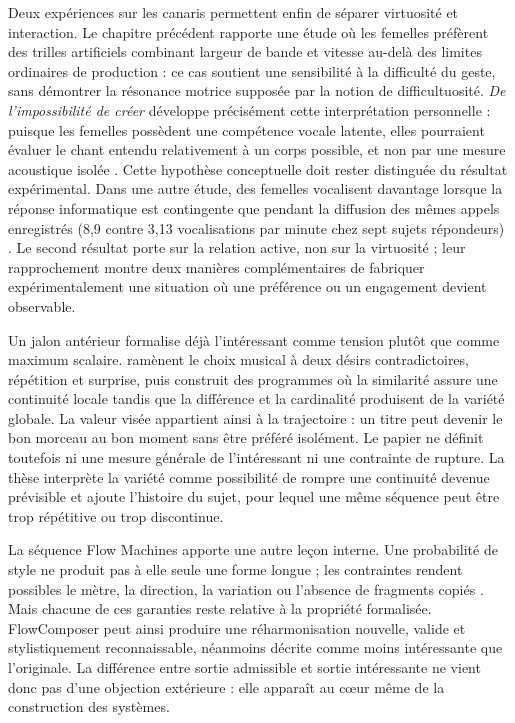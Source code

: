 \documentclass[11pt,a4paper]{article}
\begin{document}
Deux expériences sur les canaris permettent enfin de séparer virtuosité et
interaction. Le chapitre précédent rapporte une étude où les femelles préfèrent
des trilles artificiels combinant largeur de bande et vitesse au-delà des limites
ordinaires de production : ce cas soutient une sensibilité à la difficulté du
geste, sans démontrer la résonance motrice supposée par la notion de
difficultuosité. \emph{De l'impossibilité de créer} développe précisément cette
interprétation personnelle : puisque les femelles possèdent une compétence vocale
latente, elles pourraient évaluer le chant entendu relativement à un corps possible,
et non par une mesure acoustique isolée \parencite{pachet2026impossibilite}. Cette
hypothèse conceptuelle doit rester distinguée du résultat expérimental. Dans une
autre étude, des femelles vocalisent davantage lorsque
la réponse informatique est contingente que pendant la diffusion des mêmes
appels enregistrés (8,9 contre 3,13 vocalisations par minute chez sept sujets
répondeurs) \parencite{pachet2011hitsong,lerch2011closedloop}. Le second résultat
porte sur la relation active, non sur la virtuosité ; leur rapprochement montre
deux manières complémentaires de fabriquer expérimentalement une situation où
une préférence ou un engagement devient observable.

Un jalon antérieur formalise déjà l'intéressant comme tension plutôt que comme
maximum scalaire. \textcite{pachet1999programs} ramènent le choix musical à deux
désirs contradictoires, répétition et surprise, puis construit des programmes où
la similarité assure une continuité locale tandis que la différence et la
cardinalité produisent de la variété globale. La valeur visée appartient ainsi à
la trajectoire : un titre peut devenir le bon morceau au bon moment sans être
préféré isolément. Le papier ne définit toutefois ni une mesure générale de
l'intéressant ni une contrainte de rupture. La thèse interprète la variété comme
possibilité de rompre une continuité devenue prévisible et ajoute l'histoire du
sujet, pour lequel une même séquence peut être trop répétitive ou trop
discontinue.

La séquence Flow Machines apporte une autre leçon interne. Une probabilité de style
ne produit pas à elle seule une forme longue ; les contraintes rendent possibles le
mètre, la direction, la variation ou l'absence de fragments copiés
\parencite{pachet2011markov,barbieri2012lyrics,papadopoulos2014avoiding,
papadopoulos2016nonplagiaristic,papadopoulos2016flowcomposer,
pachet2017variations}. Mais chacune de ces garanties reste relative à la propriété
formalisée. FlowComposer peut ainsi produire une réharmonisation nouvelle, valide et
stylistiquement reconnaissable, néanmoins décrite comme moins intéressante que
l'originale. La différence entre sortie admissible et sortie intéressante ne vient
donc pas d'une objection extérieure : elle apparaît au cœur même de la construction
des systèmes.
\end{document}
